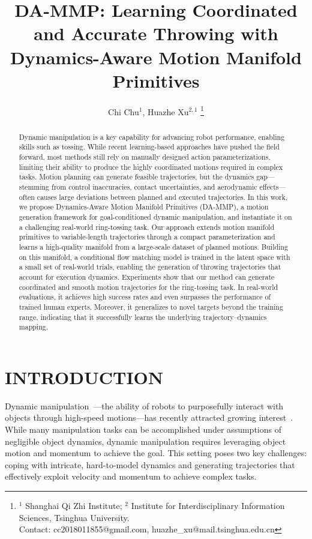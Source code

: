 \documentclass[letterpaper, 10 pt, conference]{ieeeconf}  %
\title{\LARGE \bf
DA-MMP: Learning Coordinated and Accurate Throwing with Dynamics-Aware Motion Manifold Primitives
}
\author{
Chi Chu$^{1}$, Huazhe Xu$^{2,1}$%
\thanks{%
\protect\raggedright
$^{1}$ Shanghai Qi Zhi Institute; $^{2}$ Institute for Interdisciplinary Information Sciences, Tsinghua University.\protect\\
\protect\hspace*{1em}Contact: cc2018011855@gmail.com, huazhe\_xu@mail.tsinghua.edu.cn}
}
\begin{document}
\maketitle
\thispagestyle{empty}
\pagestyle{empty}

\begin{abstract}
Dynamic manipulation is a key capability for advancing robot performance, enabling skills such as tossing. 
While recent learning-based approaches have pushed the field forward, most methods still rely on manually designed action parameterizations, limiting their ability to produce the highly coordinated motions required in complex tasks. 
Motion planning can generate feasible trajectories, but the dynamics gap—stemming from control inaccuracies, contact uncertainties, and aerodynamic effects—often causes large deviations between planned and executed trajectories. 
In this work, we propose Dynamics-Aware Motion Manifold Primitives (DA-MMP), a motion generation framework for goal-conditioned dynamic manipulation, and instantiate it on a challenging real-world ring-tossing task.
Our approach extends motion manifold primitives to variable-length trajectories through a compact parameterization and learns a high-quality manifold from a large-scale dataset of planned motions. 
Building on this manifold, a conditional flow matching model is trained in the latent space with a small set of real-world trials, enabling the generation of throwing trajectories that account for execution dynamics.
Experiments show that our method can generate coordinated and smooth motion trajectories for the ring-tossing task.
In real-world evaluations, it achieves high success rates and even surpasses the performance of trained human experts.
Moreover, it generalizes to novel targets beyond the training range, indicating that it successfully learns the underlying trajectory–dynamics mapping.
\end{abstract}

\section{INTRODUCTION}

Dynamic manipulation~\cite{mason1993dynamicmanipulation, lynch1999dynamic}---the ability of robots to purposefully interact with objects through high-speed motions---has recently attracted growing interest~\cite{ma2025badminton, su2025hitterhumanoidtabletennis, dambrosio2025achievinghumanlevelcompetitive, zhang2024catchit}. 
While many manipulation tasks can be accomplished under assumptions of negligible object dynamics, dynamic manipulation requires leveraging object motion and momentum to achieve the goal. 
This setting poses two key challenges: coping with intricate, hard-to-model dynamics and generating trajectories that effectively exploit velocity and momentum to achieve complex tasks.
\end{document}
